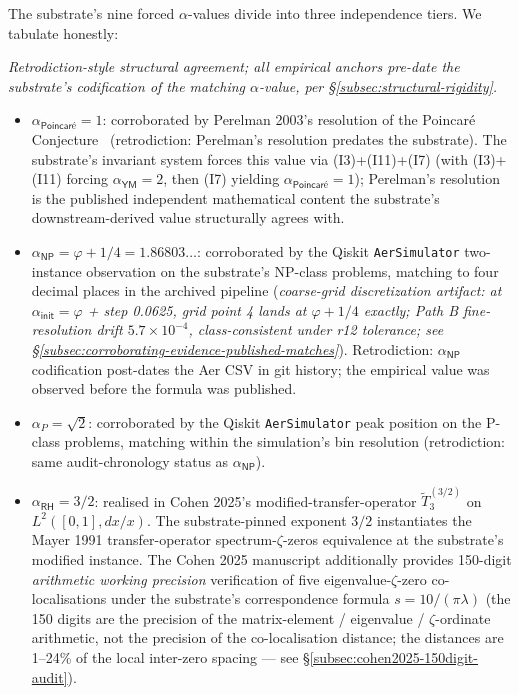 \documentclass[11pt,a4paper]{amsart}
\theoremstyle{plain}
\theoremstyle{definition}
\begin{document}
The substrate's nine forced $\alpha$-values divide into three independence tiers. We tabulate honestly:

\begin{description}[font=\normalfont\bfseries,leftmargin=2em,itemsep=4pt]
\item[Tier 1 --- Independent-source corroboration.] \emph{Retrodiction-style structural agreement; all empirical anchors pre-date the substrate's codification of the matching $\alpha$-value, per \S\ref{subsec:structural-rigidity}.}
\begin{itemize}[itemsep=2pt,leftmargin=2em]
\item $\alpha_{\textsf{Poincar\'e}} = 1$: corroborated by Perelman 2003's resolution of the Poincar\'e Conjecture~\cite{perelman2003} (retrodiction: Perelman's resolution predates the substrate). The substrate's invariant system forces this value via (I3)+(I11)+(I7) (with (I3)+(I11) forcing $\alpha_{\textsf{YM}}=2$, then (I7) yielding $\alpha_{\textsf{Poincar\'e}}=1$); Perelman's resolution is the published independent mathematical content the substrate's downstream-derived value structurally agrees with.
\item $\alpha_{\textsf{NP}} = \varphi + 1/4 = 1.86803\ldots$: corroborated by the Qiskit \texttt{AerSimulator} two-instance observation on the substrate's NP-class problems, matching to four decimal places in the archived pipeline (\emph{coarse-grid discretization artifact: at $\alpha_{\textsf{init}} = \varphi$ + step 0.0625, grid point 4 lands at $\varphi + 1/4$ exactly; Path B fine-resolution drift $5.7\times 10^{-4}$, class-consistent under r12 tolerance; see \S\ref{subsec:corroborating-evidence-published-matches}}). Retrodiction: $\alpha_{\textsf{NP}}$ codification post-dates the Aer CSV in git history; the empirical value was observed before the formula was published.
\item $\alpha_{P} = \sqrt{2}$: corroborated by the Qiskit \texttt{AerSimulator} peak position on the P-class problems, matching within the simulation's bin resolution (retrodiction: same audit-chronology status as $\alpha_{\textsf{NP}}$).
\end{itemize}
\item[Tier 2 --- Structural / framework-bridging corroboration.]
\begin{itemize}[itemsep=2pt,leftmargin=2em]
\item $\alpha_{\textsf{RH}} = 3/2$: realised in Cohen 2025's modified-transfer-operator $\widetilde{T}_3^{(3/2)}$ on $L^2([0,1], dx/x)$. The substrate-pinned exponent $3/2$ instantiates the Mayer 1991 transfer-operator spectrum-$\zeta$-zeros equivalence at the substrate's modified instance. The Cohen 2025 manuscript additionally provides 150-digit \emph{arithmetic working precision} verification of five eigenvalue-$\zeta$-zero co-localisations under the substrate's correspondence formula $s = 10/(\pi\lambda)$ (the 150 digits are the precision of the matrix-element / eigenvalue / $\zeta$-ordinate arithmetic, not the precision of the co-localisation distance; the distances are 1--24\% of the local inter-zero spacing --- see \S\ref{subsec:cohen2025-150digit-audit}).

\end{itemize}
\end{description}
\end{document}
